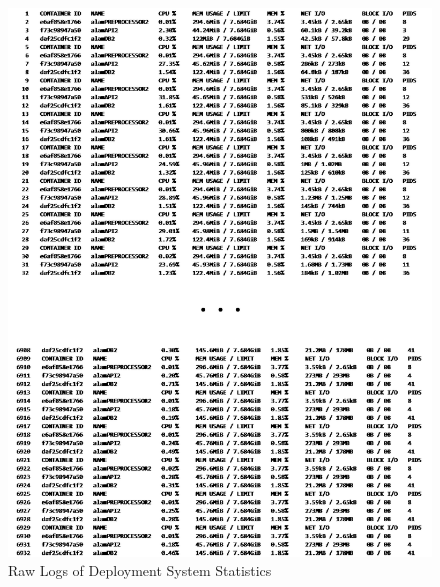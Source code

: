 \begin{figure}[ht]
    \centering
    \includegraphics[height=0.80\textheight]{./assets/Appendices/B/RawTestsData/RawLogs/DeploymentStats.png}
    \caption{Raw Logs of Deployment System Statistics}
    \label{fig:deployStats}
\end{figure}
\FloatBarrier

